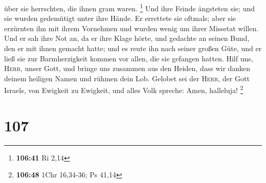über sie herrschten, die ihnen gram waren. \footnote{\textbf{106:41} Ri
  2,14}  Und ihre Feinde ängsteten sie; und sie wurden
gedemütigt unter ihre Hände.  Er errettete sie oftmals;
aber sie erzürnten ihn mit ihrem Vornehmen und wurden wenig um ihrer
Missetat willen.  Und er sah ihre Not an, da er ihre
Klage hörte,  und gedachte an seinen Bund, den er mit
ihnen gemacht hatte; und es reute ihn nach seiner großen Güte,
 und er ließ sie zur Barmherzigkeit kommen vor allen, die
sie gefangen hatten.  Hilf uns, \textsc{Herr}, unser
Gott, und bringe uns zusammen aus den Heiden, dass wir danken deinem
heiligen Namen und rühmen dein Lob.  Gelobet sei der
\textsc{Herr}, der Gott Israels, von Ewigkeit zu Ewigkeit, und alles
Volk spreche: Amen, halleluja! \footnote{\textbf{106:48} 1Chr 16,34-36;
  Ps 41,14}

\hypertarget{section-34}{%
\section{107}\label{section-34}}

